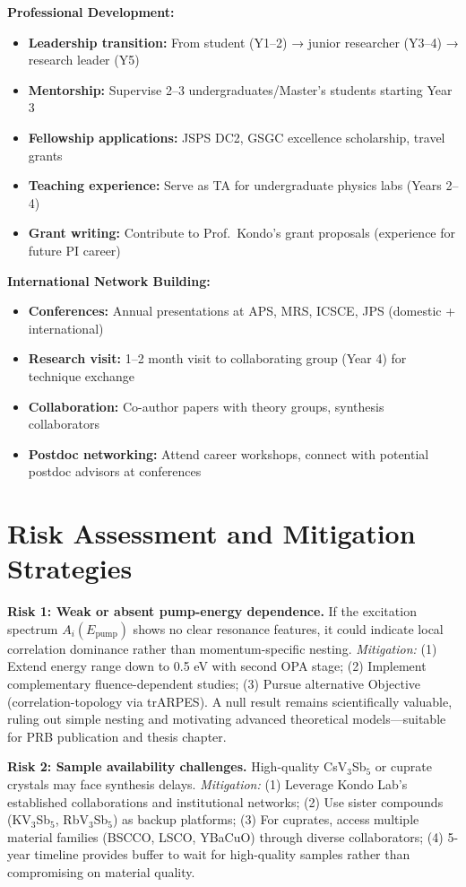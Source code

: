 \documentclass[12pt,a4paper]{article}
\begin{document}
\textbf{Professional Development:}
\begin{itemize}
    \item \textbf{Leadership transition:} From student (Y1--2) → junior researcher (Y3--4) → research leader (Y5)
    \item \textbf{Mentorship:} Supervise 2--3 undergraduates/Master's students starting Year 3
    \item \textbf{Fellowship applications:} JSPS DC2, GSGC excellence scholarship, travel grants
    \item \textbf{Teaching experience:} Serve as TA for undergraduate physics labs (Years 2--4)
    \item \textbf{Grant writing:} Contribute to Prof.~Kondo's grant proposals (experience for future PI career)
\end{itemize}

\textbf{International Network Building:}
\begin{itemize}
    \item \textbf{Conferences:} Annual presentations at APS, MRS, ICSCE, JPS (domestic + international)
    \item \textbf{Research visit:} 1--2 month visit to collaborating group (Year 4) for technique exchange
    \item \textbf{Collaboration:} Co-author papers with theory groups, synthesis collaborators
    \item \textbf{Postdoc networking:} Attend career workshops, connect with potential postdoc advisors at conferences
\end{itemize}

\section{Risk Assessment and Mitigation Strategies}

\textbf{Risk 1: Weak or absent pump-energy dependence.} If the excitation spectrum $A_i(E_{\text{pump}})$ shows no clear resonance features, it could indicate local correlation dominance rather than momentum-specific nesting. \textit{Mitigation:} (1) Extend energy range down to 0.5 eV with second OPA stage; (2) Implement complementary fluence-dependent studies; (3) Pursue alternative Objective (correlation-topology via trARPES). A null result remains scientifically valuable, ruling out simple nesting and motivating advanced theoretical models—suitable for PRB publication and thesis chapter.

\textbf{Risk 2: Sample availability challenges.} High-quality CsV$_3$Sb$_5$ or cuprate crystals may face synthesis delays. \textit{Mitigation:} (1) Leverage Kondo Lab's established collaborations and institutional networks; (2) Use sister compounds (KV$_3$Sb$_5$, RbV$_3$Sb$_5$) as backup platforms; (3) For cuprates, access multiple material families (BSCCO, LSCO, YBaCuO) through diverse collaborators; (4) 5-year timeline provides buffer to wait for high-quality samples rather than compromising on material quality.
\end{document}
